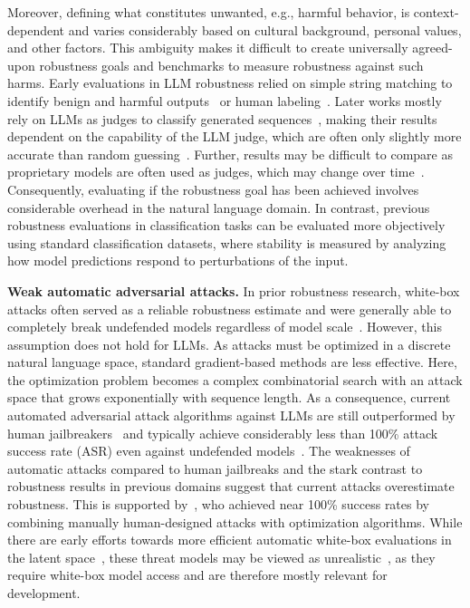 Moreover, defining what constitutes unwanted, e.g., harmful behavior, is context-dependent and varies considerably based on cultural background, personal values, and other factors. This ambiguity makes it difficult to create universally agreed-upon robustness goals and benchmarks to measure robustness against such harms. Early evaluations in LLM robustness relied on simple string matching to identify benign and harmful outputs~\cite{zou2023universal} or human labeling~\cite{zhu2023autodan}. Later works mostly rely on LLMs as judges to classify generated sequences~\cite{zhu2023autodan, mazeika2024harmbench}, making their results dependent on the capability of the LLM judge, which are often only slightly more accurate than random guessing~\cite{tan2024judgebench, shi2024judging}. Further, results may be difficult to compare as proprietary models are often used as judges, which may change over time~\cite{zhu2023autodan}. Consequently, evaluating if the robustness goal has been achieved involves considerable overhead in the natural language domain. 
In contrast, previous robustness evaluations in classification tasks can be evaluated more objectively using standard classification datasets, where stability is measured by analyzing how model predictions respond to perturbations of the input.

\textbf{Weak automatic adversarial attacks.} In prior robustness research, white-box attacks often served as a reliable robustness estimate and were generally able to completely break undefended models regardless of model scale~\cite{shao2021adversarial}. However, this assumption does not hold for LLMs. As attacks must be optimized in a discrete natural language space, standard gradient-based methods are less effective. Here, the optimization problem becomes a complex combinatorial search with an attack space that grows exponentially with sequence length. As a consequence, current automated adversarial attack algorithms against LLMs are still outperformed by human jailbreakers~\cite{li2024llm} and typically achieve considerably less than 100\% attack success rate (ASR) even against undefended models~\cite{zou2023universal}. The weaknesses of automatic attacks compared to human jailbreaks and the stark contrast to robustness results in previous domains suggest that current attacks overestimate robustness. This is supported by~\citet{andriushchenko2024jailbreaking}, who achieved near 100\% success rates by combining manually human-designed attacks with optimization algorithms. While there are early efforts towards more efficient automatic white-box evaluations in the latent space~\cite{schwinn2024soft, che2025model}, these threat models may be viewed as unrealistic~\cite{zou2024improving}, as they require white-box model access and are therefore mostly relevant for development.

